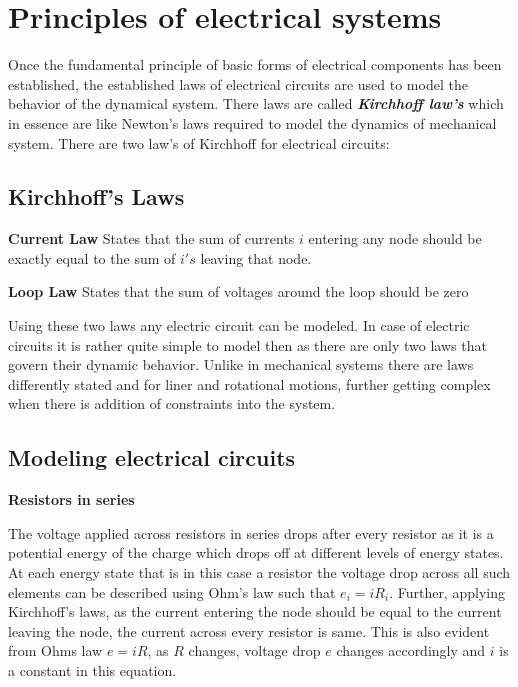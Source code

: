 \section{Principles of electrical systems}

Once the fundamental principle of basic forms of electrical components has been established, the established laws of electrical circuits are used to model the behavior of the dynamical system. There laws are called \textbf{\textit{Kirchhoff law's}} which in essence are like Newton's laws required to model the dynamics of mechanical system. There are two law's of Kirchhoff for electrical circuits:

\subsection{Kirchhoff's Laws}

\textbf{Current Law}
States that the sum of currents $i$ entering any node should be exactly equal to the sum of $i's$ leaving that node.

\textbf{Loop Law}
States that the sum of voltages around the loop should be zero

Using these two laws any electric circuit can be modeled. In case of electric circuits it is rather quite simple to model then as there are only two laws that govern their dynamic behavior. Unlike in mechanical systems there are laws differently stated and for liner and rotational motions, further getting complex when there is addition of constraints into the system.

\subsection{Modeling electrical circuits}

\textbf{Resistors in series}

The voltage applied across resistors in series drops after every resistor as it is a potential energy of the charge which drops off at different levels of energy states. At each energy state that is in this case a resistor the voltage drop across all such elements can be described using Ohm's law such that $e_i = i R_{i}$. Further, applying Kirchhoff's laws, as the current entering the node should be equal to the current leaving the node, the current across every resistor is same. This is also evident from Ohms law $e = i R$, as $R$ changes, voltage drop $e$ changes accordingly and $i$ is a constant in this equation.

